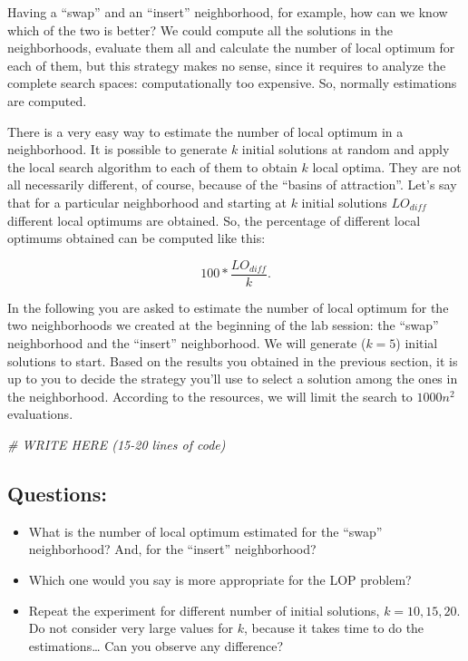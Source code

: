 \documentclass[
]{article}
\newenvironment{Shaded}{\begin{snugshade}}{\end{snugshade}}
\newcommand{\CommentTok}[1]{\textcolor[rgb]{0.56,0.35,0.01}{\textit{#1}}}
\begin{document}
Having a ``swap'' and an ``insert'' neighborhood, for example, how can
we know which of the two is better? We could compute all the solutions
in the neighborhoods, evaluate them all and calculate the number of
local optimum for each of them, but this strategy makes no sense, since
it requires to analyze the complete search spaces: computationally too
expensive. So, normally estimations are computed.

There is a very easy way to estimate the number of local optimum in a
neighborhood. It is possible to generate \(k\) initial solutions at
random and apply the local search algorithm to each of them to obtain
\(k\) local optima. They are not all necessarily different, of course,
because of the ``basins of attraction''. Let's say that for a particular
neighborhood and starting at \(k\) initial solutions \(LO_{diff}\)
different local optimums are obtained. So, the percentage of different
local optimums obtained can be computed like this:

\[ 100*\frac{LO_{diff}}{k}.\]

In the following you are asked to estimate the number of local optimum
for the two neighborhoods we created at the beginning of the lab
session: the ``swap'' neighborhood and the ``insert'' neighborhood. We
will generate (\(k=5\)) initial solutions to start. Based on the results
you obtained in the previous section, it is up to you to decide the
strategy you'll use to select a solution among the ones in the
neighborhood. According to the resources, we will limit the search to
\(1000n^2\) evaluations.

\begin{Shaded}
\begin{Highlighting}[]
\CommentTok{\# WRITE HERE (15{-}20 lines of code)}
\end{Highlighting}
\end{Shaded}

\hypertarget{questions-2}{%
\subsection{Questions:}\label{questions-2}}

\begin{itemize}
\item
  What is the number of local optimum estimated for the ``swap''
  neighborhood? And, for the ``insert'' neighborhood?
\item
  Which one would you say is more appropriate for the LOP problem?
\item
  Repeat the experiment for different number of initial solutions,
  \(k=10, 15, 20\). Do not consider very large values for \(k\), because
  it takes time to do the estimations\ldots{} Can you observe any
  difference?
\end{itemize}
\end{document}
